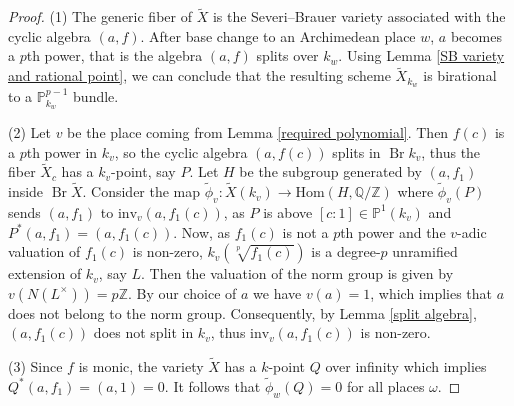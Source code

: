 \documentclass[10pt,a4paper]{amsart}
\DeclareMathOperator{\Br}{Br}
\renewcommand{\P}{{\mathbb P}}
\begin{document}
	\begin{proof}
		(1) The generic fiber of $\tilde{X}$ is the Severi--Brauer variety associated with the cyclic algebra $(a, f)$. After base change to an Archimedean place $w$, $a$ becomes a $p$th power, that is the algebra $(a, f)$ splits over $k_w$. Using Lemma \ref{SB variety and rational point}, we can conclude that the resulting scheme $\tilde{X}_{k_w}$ is birational to a $\mathbb{P}^{p-1}_{k_w}$ bundle. 
		
		(2) Let $v$ be the place coming from Lemma \ref{required polynomial}. Then $f(c)$ is a $p$th power in $k_v$, so the cyclic algebra \((a, f(c)) \) splits in \(\Br k_{v}\), thus the fiber \(\tilde{X}_c\) has a \(k_{v}\)-point, say \(P\). Let \( H\) be the subgroup generated by \((a,f_1)\) inside \(\Br\tilde{X} \). Consider the map $\tilde{\phi}_{v} : \tilde{X}(k_{v}) \to \mathrm{Hom}(H, \mathbb{Q}/\mathbb{Z})$ where \(\tilde{\phi}_{v}(P)\)  sends \((a, f_1)\) to \(\mathrm{inv}_{v}(a, f_1(c))\), as $P$ is above $[c:1]\in \P^1(k_v)$ and $P^{*}(a,f_1)=(a,f_1(c))$. Now, as $f_1(c)$ is not a $p$th power and the \(v\)-adic valuation of \(f_1(c)\) is non-zero, \( k_v(\sqrt[p]{f_1(c)}) \) is a degree-\(p\) unramified extension of \( k_v \), say $L$. Then the valuation of the norm group is given by \( v(N(L^{\times})) = p\mathbb{Z} \). By our choice of \( a \) we have \( v(a) = 1 \), which implies that \( a \) does not belong to the norm group. Consequently, by Lemma \ref{split algebra}, \( (a, f_1(c)) \) does not split in $k_{v}$, thus \(\mathrm{inv}_v(a, f_1(c))\) is non-zero.

		
		(3) Since \( f \) is monic, the variety \( \tilde{X} \) has a \( k \)-point \( Q \) over infinity which implies \( Q^*(a, f_1) = (a, 1) = 0 \). It follows that \( \tilde{\phi}_w(Q) = 0 \) for all places $\omega$.
	\end{proof}
\end{document}
